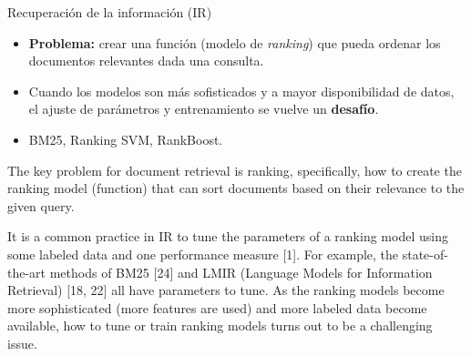 \documentclass{beamer}
\begin{document}
\begin{frame}{Recuperación de la información (IR)}
    \begin{itemize}
        \item \textbf{Problema:} crear una función (modelo de \textit{ranking}) que pueda ordenar los documentos relevantes dada una consulta.
        \item Cuando los modelos son más sofisticados y a mayor disponibilidad de datos, el ajuste de parámetros y entrenamiento se vuelve un \textbf{desafío}.
        \item BM25, Ranking SVM, RankBoost.
    \end{itemize}

    \begin{note}
        {The key problem for document retrieval is ranking, specifically, how to create the ranking model (function) that can sort documents
        based on their relevance to the given query.
        
        It is a common practice in IR to tune the parameters of a ranking model using some labeled data and one performance measure [1]. For example, the state-of-the-art methods of BM25 [24] and LMIR (Language Models for Information Retrieval) [18, 22] all have parameters to tune. As the ranking models become more sophisticated (more features are used) and more labeled data become available, how to tune or train
        ranking models turns out to be a challenging issue.}
    \end{note}
\end{frame}
\end{document}
